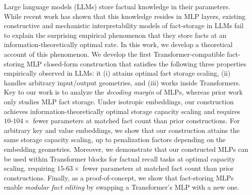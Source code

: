Large language models (LLMs) store factual knowledge in their parameters. While recent work has shown that this knowledge resides in MLP layers, existing constructive and mechanistic interpretability models of fact-storage in LLMs fail to explain the surprising empirical phenomenon that they store facts at an information-theoretically optimal rate. In this work, we develop a theoretical account of this phenomenon. We develop the first Transformer-compatible fact-storing MLP closed-form construction that satisfies the following three properties empirically observed in LLMs: it (i) attains optimal fact storage scaling, (ii) handles arbitrary input/output geometries, and (iii) works inside Transformers. Key to our work is to analyze the \emph{decoding margin} of MLPs, whereas prior work only studies MLP fact storage. Under isotropic embeddings, our construction achieves information-theoretically optimal storage capacity scaling and requires $10$-$104\times$ fewer parameters at matched fact count than prior constructions. For arbitrary key and value embeddings, we show that our construction attains the same storage capacity scaling, up to penalization factors depending on the embedding geometries. Moreover, we demonstrate that our constructed MLPs can be used within Transformer blocks for factual recall tasks at optimal capacity scaling, requiring $15$-$63\times$ fewer parameters at matched fact count than prior constructions. Finally, as a proof-of-concept, we show that fact-storing MLPs enable \emph{modular fact editing} by swapping a Transformer's MLP with a new one.



